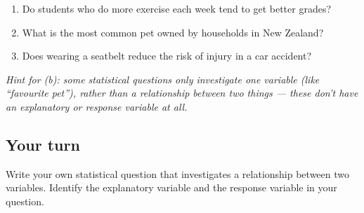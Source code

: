 \documentclass[11pt]{article}
\newcommand{\ans}{\hrulefill}
\newcommand{\anshere}{\par\vspace{0.4em}\noindent\ans\par\vspace{0.4em}}
\begin{document}
\begin{enumerate}[label=(\alph*)]
  \item Do students who do more exercise each week tend to get better grades?
  \anshere
  \item What is the most common pet owned by households in New Zealand?
  \anshere
  \item Does wearing a seatbelt reduce the risk of injury in a car accident?
  \anshere
\end{enumerate}

\vspace{0.4em}
\noindent\textit{Hint for (b): some statistical questions only investigate \emph{one} variable
(like ``favourite pet''), rather than a relationship between two things --- these don't have an
explanatory or response variable at all.}

\vspace{0.6em}
\subsection*{Your turn}
\noindent Write your own statistical question that investigates a relationship between two
variables. Identify the explanatory variable and the response variable in your question.
\anshere
\anshere
\end{document}
